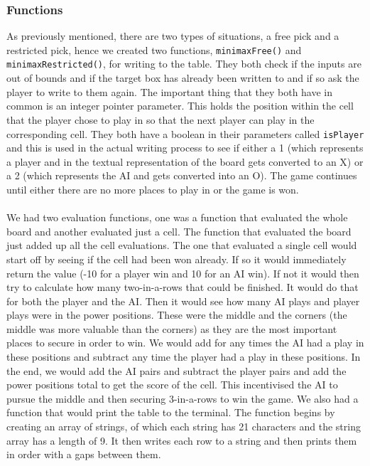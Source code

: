 \documentclass[10pt]{article}
\begin{document}
\subsubsection{Functions}
As previously mentioned, there are two types of situations, a free pick and a restricted pick, hence we created two functions, {\tt{minimaxFree()}} and {\tt{minimaxRestricted()}}, for writing to the table. They both check if the inputs are out of bounds and if the target box has already been written to and if so ask the player to write to them again. The important thing that they both have in common is an integer pointer parameter. This holds the position within the cell that the player chose to play in so that the next player can play in the corresponding cell. They both have a boolean in their parameters called {\tt{isPlayer}} and this is used in the actual writing process to see if either a 1 (which represents a player and in the textual representation of the board gets converted to an X) or a 2 (which represents the AI and gets converted into an O).
The game continues until either there are no more places to play in or the game is won.
\\\\We had two evaluation functions, one was a function that evaluated the whole board and another evaluated just a cell. The function that evaluated the board just added up all the cell evaluations. The one that evaluated a single cell would start off by seeing if the cell had been won already. If so it would immediately return the value (-10 for a player win and 10 for an AI win). If not it would then try to calculate how many two-in-a-rows that could be finished. It would do that for both the player and the AI. Then it would see how many AI plays and player plays were in the power positions. These were the middle and the corners (the middle was more valuable than the corners) as they are the most important places to secure in order to win. We would add for any times the AI had a play in these positions and subtract any time the player had a play in these positions. In the end, we would add the AI pairs and subtract the player pairs and add the power positions total to get the score of the cell. This incentivised the AI to pursue the middle and then securing 3-in-a-rows to win the game.
We also had a function that would print the table to the terminal. The function begins by creating an array of strings, of which each string has 21 characters and the string array has a length of 9. It then writes each row to a string and then prints them in order with a gaps between them.
\end{document}
